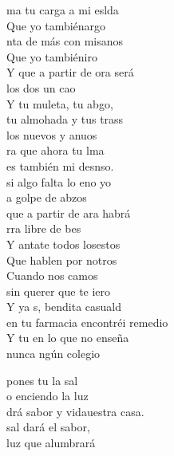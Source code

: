 \documentclass[12pt]{article}
\begin{document}
\begin{multicols*}{2}
\begin{cancion}%
	ma tu carga a mi eslda\\
	Que yo tambiénargo\\
	nta de más con misanos\\
	Que yo tambiéniro\\
	Y  que a partir de ora será\\
	 los dos un cao\\
	Y tu muleta, tu abgo,\\
	tu almohada y tus trass\\
	los nuevos y anuos\\
	ra que ahora tu lma\\
	es también mi desnso.\\
	 si algo falta lo eno yo\\
	a golpe de abzos\\
	que a partir de ara habrá\\
	rra libre de bes\\
	Y antate todos losestos\\
	Que hablen por notros\\
	Cuando nos camos\\
	 sin querer que te iero\\
	Y ya s, bendita casuald\\
	 en tu farmacia encontréi remedio\\
	Y tu en  lo que no enseña  \\
	nunca ngún colegio\\
	\begin{chorus}%
	 pones tu la sal \\
	o enciendo la luz\\
	drá sabor y vidauestra casa.\\
	 sal dará el sabor, \\
	luz que alumbrará\\

\end{chorus}
\end{cancion}
\end{multicols*}
\end{document}
